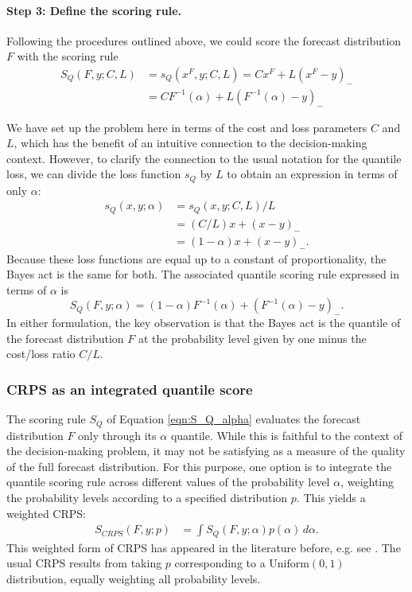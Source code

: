 \documentclass{article}
\begin{document}
\paragraph{Step 3: Define the scoring rule.} Following the procedures outlined above, we could score the forecast distribution $F$ with the scoring rule
\begin{align*}
S_Q(F, y; C, L) &= s_Q(x^F, y; C, L) = Cx^F + L(x^F-y)_- \nonumber \\
&= C F^{-1}(\alpha) + L \left(F^{-1}(\alpha) - y\right)_- \label{eqn:S_Q_CL}
\end{align*}

We have set up the problem here in terms of the cost and loss parameters $C$ and $L$, which has the benefit of an intuitive connection to the decision-making context. However, to clarify the connection to the usual notation for the quantile loss, we can divide the loss function $s_Q$ by $L$ to obtain an expression in terms of only $\alpha$:
\begin{align*}
s_Q(x,y; \alpha) &= s_Q(x,y; C, L)/L \\
&= (C/L)x + (x-y)_- \\
&= (1 - \alpha)x + (x-y)_-.
\end{align*}
Because these loss functions are equal up to a constant of proportionality, the Bayes act is the same for both. The associated quantile scoring rule expressed in terms of $\alpha$ is
\begin{equation}
S_Q(F, y; \alpha) = (1 - \alpha)F^{-1}(\alpha) + \left(F^{-1}(\alpha) - y\right)_-. \label{eqn:S_Q_alpha}
\end{equation}
In either formulation, the key observation is that the Bayes act is the quantile of the forecast distribution $F$ at the probability level given by one minus the cost/loss ratio $C/L$.

\subsubsection{CRPS as an integrated quantile score}
\label{sec:methods.quantileloss.crps}

The scoring rule $S_Q$ of Equation \eqref{eqn:S_Q_alpha} evaluates the forecast distribution $F$ only through its $\alpha$ quantile. While this is faithful to the context of the decision-making problem, it may not be satisfying as a measure of the quality of the full forecast distribution. For this purpose, one option is to integrate the quantile scoring rule across different values of the probability level $\alpha$, weighting the probability levels according to a specified distribution $p$. This yields a weighted CRPS:
\begin{align*}
S_{CRPS}(F, y; p) &= \int S_Q(F, y; \alpha) p(\alpha) \, d\alpha.
\end{align*}
This weighted form of CRPS has appeared in the literature before, e.g. see \cite{gneiting2011weightedScoringRules}. The usual CRPS results from taking $p$ corresponding to a $\text{Uniform}(0,1)$ distribution, equally weighting all probability levels.
\end{document}
